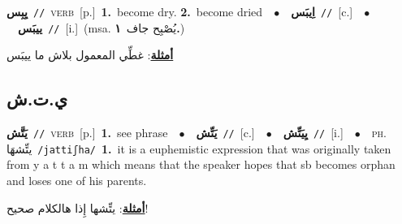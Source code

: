 \documentclass[10pt,a4paper,twoside]{article} %
\begin{document}
\begin{multicols}{2}
{\setlength\topsep{0pt}\textbf{\foreignlanguage{arabic}{يِبِس}}\ {\color{gray}\texttt{//}\color{black}}\ \textsc{verb}\ [p.]\ \textbf{1.}~become dry.  \textbf{2.}~become dried\ \ $\bullet$\ \ \setlength\topsep{0pt}\textbf{\foreignlanguage{arabic}{اِيبَس}}\ {\color{gray}\texttt{//}\color{black}}\ [c.]\ \ $\bullet$\ \ \setlength\topsep{0pt}\textbf{\foreignlanguage{arabic}{ييبَس}}\ {\color{gray}\texttt{//}\color{black}}\ [i.]\ \color{gray}(msa. \foreignlanguage{arabic}{يُصْبِح جاف}~\foreignlanguage{arabic}{\textbf{١.}})\color{black}\  \begin{flushright}\color{gray}\foreignlanguage{arabic}{\textbf{\underline{\foreignlanguage{arabic}{أمثلة}}}: غطِّي المعمول بلاش ما ييبَس}\end{flushright}\color{black}} \vspace{2mm}

\vspace{-3mm}
\subsection*{\color{blue}\foreignlanguage{arabic}{ي.ت.ش}\color{blue}{}} 

{\setlength\topsep{0pt}\textbf{\foreignlanguage{arabic}{يَتَّش}}\ {\color{gray}\texttt{//}\color{black}}\ \textsc{verb}\ [p.]\ \textbf{1.}~see phrase\ \ $\bullet$\ \ \setlength\topsep{0pt}\textbf{\foreignlanguage{arabic}{يَتِّش}}\ {\color{gray}\texttt{//}\color{black}}\ [c.]\ \ $\bullet$\ \ \setlength\topsep{0pt}\textbf{\foreignlanguage{arabic}{يِيَتِّش}}\ {\color{gray}\texttt{//}\color{black}}\ [i.]\ \ $\bullet$\ \ \textsc{ph.} \color{gray} \foreignlanguage{arabic}{يتِّشهَا}\color{black}\ {\color{gray}\texttt{/{\sffamily jattiʃha}/}\color{black}}\ \textbf{1.}~it is a euphemistic expression that was originally taken from y a t t a m which means that the speaker hopes that sb becomes orphan and loses one of his parents.\  \begin{flushright}\color{gray}\foreignlanguage{arabic}{\textbf{\underline{\foreignlanguage{arabic}{أمثلة}}}: يتِّشها إِذا هالكلام صحيح!}\end{flushright}\color{black}} \vspace{2mm}


\end{multicols}
\end{document}
